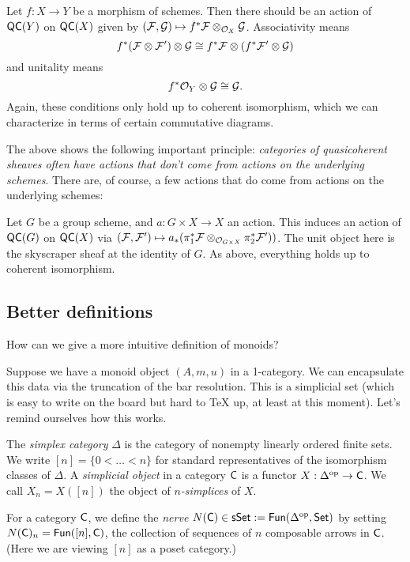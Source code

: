 \documentclass{article}
\begin{document}
\begin{ex}
	Let $f: X \to Y$ be a morphism of schemes.
	Then there should be an action of $\mathsf{QC}(Y)$ on $\mathsf{QC}(X)$ given by $(\mathcal{F}, \mathcal{G}) \mapsto f^* \mathcal{F} \otimes_{\mathcal{O}_X} \mathcal{G}$.
	Associativity means
	\[
		f^*(\mathcal{F} \otimes \mathcal{F}') \otimes \mathcal{G} \cong f^* \mathcal{F} \otimes (f^* \mathcal{F}' \otimes \mathcal{G})
	\]
	and unitality means
	\[
		f^* \mathcal{O}_Y \otimes \mathcal{G} \cong \mathcal{G}.
	\]
	Again, these conditions only hold up to coherent isomorphism, which we can characterize in terms of certain commutative diagrams.
\end{ex}

The above shows the following important principle: \emph{categories of quasicoherent sheaves often have actions that don't come from actions on the underlying schemes}.
There are, of course, a few actions that do come from actions on the underlying schemes:

\begin{ex}
	Let $G$ be a group scheme, and $a: G \times X \to X$ an action.
	This induces an action of $\mathsf{QC}(G)$ on $\mathsf{QC}(X)$ via $(\mathcal{F}, \mathcal{F}') \mapsto a_*(\pi_1^* \mathcal{F} \otimes_{\mathcal{O}_{G \times X}} \pi_2^* \mathcal{F}'))$.
	The unit object here is the skyscraper sheaf at the identity of $G$.
	As above, everything holds up to coherent isomorphism.
\end{ex}

\subsection{Better definitions}

How can we give a more intuitive definition of monoids?

Suppose we have a monoid object $(A, m, u)$ in a 1-category.
We can encapsulate this data via the truncation of the bar resolution.
This is a simplicial set (which is easy to write on the board but hard to TeX up, at least at this moment).
Let's remind ourselves how this works.

\begin{dfn}
	The \emph{simplex category} $\Delta$ is the category of nonempty linearly ordered finite sets.
	We write $[n] = \{ 0 < \dots < n \}$ for standard representatives of the isomorphism classes of $\Delta$.
	A \emph{simplicial object} in a category $\mathsf{C}$ is a functor $X: \Delta^{\mathrm{op}} \to \mathsf{C}$.
	We call $X_n = X([n])$ the object of \emph{$n$-simplices} of $X$.
\end{dfn}

\begin{dfn}
	For a category $\mathsf{C}$, we define the \emph{nerve} $N(\mathsf{C}) \in \mathsf{sSet} := \mathsf{Fun}(\Delta^{\mathrm{op}}, \mathsf{Set})$ by setting $N(\mathsf{C})_n = \mathsf{Fun}([n], \mathsf{C})$, the collection of sequences of $n$ composable arrows in $\mathsf{C}$.
	(Here we are viewing $[n]$ as a poset category.)
\end{dfn}
\end{document}
